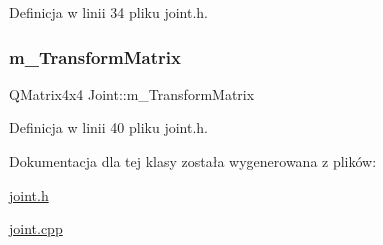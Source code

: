 Definicja w linii 34 pliku joint.\+h.

\mbox{\label{class_joint_adc692e48ac1dc140134627aa445dc160}} 
\subsubsection{\texorpdfstring{m\+\_\+\+Transform\+Matrix}{m\_TransformMatrix}}
{\footnotesize\ttfamily Q\+Matrix4x4 Joint\+::m\+\_\+\+Transform\+Matrix\hspace{0.3cm}{\ttfamily [protected]}}



Definicja w linii 40 pliku joint.\+h.



Dokumentacja dla tej klasy została wygenerowana z plików\+:\begin{DoxyCompactItemize}
\item 
\hyperlink{joint_8h}{joint.\+h}\item 
\hyperlink{joint_8cpp}{joint.\+cpp}\end{DoxyCompactItemize}
